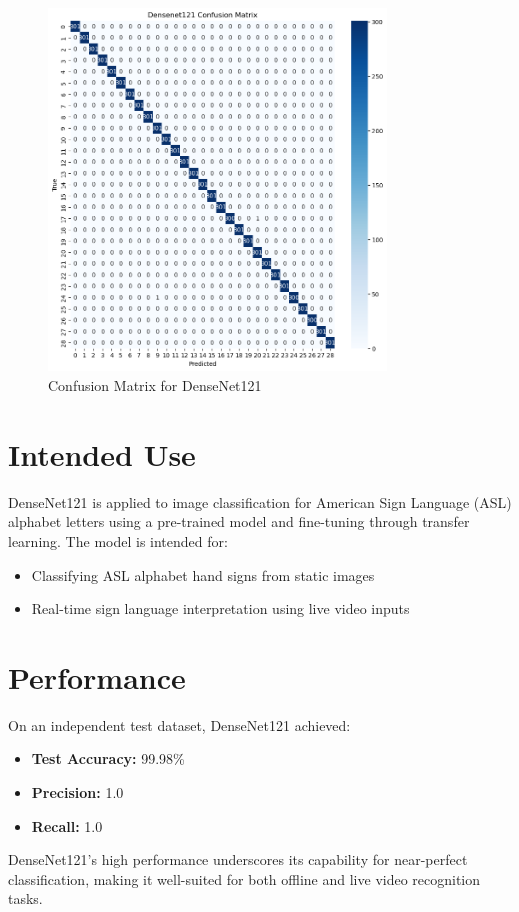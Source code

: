 \documentclass[12pt, a4paper]{article}
\begin{document}
\begin{figure}[H]
    \centering
    \includegraphics[width=0.8\textwidth]{../../plots/DenseNet121_ConfusionMatrix.png}
    \caption{Confusion Matrix for DenseNet121}
    \label{fig:densenet121_confusion_matrix}
\end{figure}
\section{Intended Use}
DenseNet121 is applied to image classification for American Sign Language (ASL) alphabet letters using a pre-trained model and fine-tuning through transfer learning. The model is intended for:
\begin{itemize}
    \item Classifying ASL alphabet hand signs from static images
    \item Real-time sign language interpretation using live video inputs
\end{itemize}

\section{Performance}
On an independent test dataset, DenseNet121 achieved:
\begin{itemize}
    \item \textbf{Test Accuracy:} 99.98\%
    \item \textbf{Precision:} 1.0
    \item \textbf{Recall:} 1.0
\end{itemize}
DenseNet121’s high performance underscores its capability for near-perfect classification, making it well-suited for both offline and live video recognition tasks.
\end{document}
